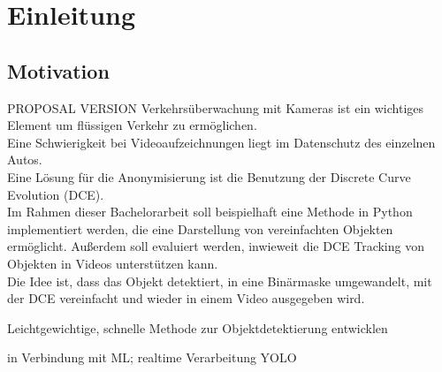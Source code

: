 \chapter{Einleitung}
\label{ch:intro}


\section{Motivation}{ PROPOSAL VERSION
	Verkehrsüberwachung mit Kameras ist ein wichtiges Element um flüssigen Verkehr zu ermöglichen. \\
	Eine Schwierigkeit bei Videoaufzeichnungen liegt im Datenschutz des einzelnen Autos.  \\
	Eine Lösung für die Anonymisierung ist die Benutzung der Discrete Curve Evolution (DCE).\\
	Im Rahmen dieser Bachelorarbeit soll beispielhaft eine Methode in Python implementiert werden, die eine Darstellung von vereinfachten Objekten ermöglicht. Außerdem soll evaluiert werden, inwieweit die DCE Tracking von Objekten in Videos unterstützen kann. \\
	Die Idee ist, dass das Objekt detektiert, in eine Binärmaske umgewandelt, mit der DCE vereinfacht und wieder in einem Video ausgegeben wird.

	\begin{list}{-}{Notizen}
		\item Leichtgewichtige, schnelle Methode zur Objektdetektierung entwicklen
		\item in Verbindung mit ML; realtime Verarbeitung YOLO
	\end{list}
}

